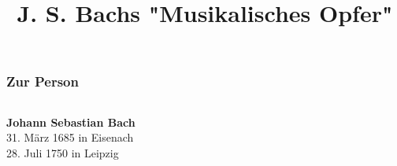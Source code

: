 \documentclass{beamer}
\title[] {J. S. Bachs "Musikalisches Opfer"}
\date{} %
\begin{document}
\frame{\titlepage}

\begin{frame}
	\frametitle{Zur Person}
    \begin{columns}[T] 
	    \vspace{2cm}
	    \textbf{Johann Sebastian Bach} \\
	    \textborn \hspace{0.3em} 31. März 1685 in Eisenach \\
	    \textdagger \hspace{0.3em} 28. Juli 1750 in Leipzig
    \end{columns}
\end{frame}
\end{document}
